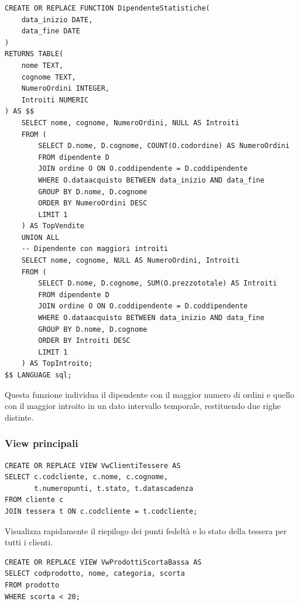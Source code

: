 \documentclass[a4paper,12pt]{article}
\begin{document}
\begin{lstlisting}[style=sqlstyle]
CREATE OR REPLACE FUNCTION DipendenteStatistiche(
    data_inizio DATE,
    data_fine DATE
)
RETURNS TABLE(
    nome TEXT,
    cognome TEXT,
    NumeroOrdini INTEGER,
    Introiti NUMERIC
) AS $$
    SELECT nome, cognome, NumeroOrdini, NULL AS Introiti
    FROM (
        SELECT D.nome, D.cognome, COUNT(O.codordine) AS NumeroOrdini
        FROM dipendente D
        JOIN ordine O ON O.coddipendente = D.coddipendente
        WHERE O.dataacquisto BETWEEN data_inizio AND data_fine
        GROUP BY D.nome, D.cognome
        ORDER BY NumeroOrdini DESC
        LIMIT 1
    ) AS TopVendite
    UNION ALL
    -- Dipendente con maggiori introiti
    SELECT nome, cognome, NULL AS NumeroOrdini, Introiti
    FROM (
        SELECT D.nome, D.cognome, SUM(O.prezzototale) AS Introiti
        FROM dipendente D
        JOIN ordine O ON O.coddipendente = D.coddipendente
        WHERE O.dataacquisto BETWEEN data_inizio AND data_fine
        GROUP BY D.nome, D.cognome
        ORDER BY Introiti DESC
        LIMIT 1
    ) AS TopIntroito;
$$ LANGUAGE sql;
\end{lstlisting}

\noindent
Questa funzione individua il dipendente con il maggior numero di ordini e quello con il maggior introito in un dato intervallo temporale, restituendo due righe distinte.  

\subsubsection{View principali}

\begin{lstlisting}[style=sqlstyle]
CREATE OR REPLACE VIEW VwClientiTessere AS
SELECT c.codcliente, c.nome, c.cognome,
       t.numeropunti, t.stato, t.datascadenza
FROM cliente c
JOIN tessera t ON c.codcliente = t.codcliente;
\end{lstlisting}

\noindent
Visualizza rapidamente il riepilogo dei punti fedeltà e lo stato della tessera per tutti i clienti.  

\begin{lstlisting}[style=sqlstyle]
CREATE OR REPLACE VIEW VwProdottiScortaBassa AS
SELECT codprodotto, nome, categoria, scorta
FROM prodotto
WHERE scorta < 20;
\end{lstlisting}
\end{document}
